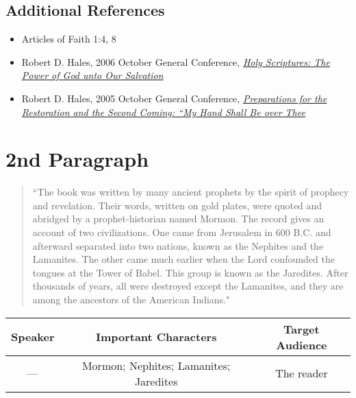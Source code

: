 \documentclass[12pt]{report}
\begin{document}
\subsection{Additional References\label{intro:references1}}
\begin{itemize}
\item Articles of Faith 1:4, 8
\item Robert D. Hales, 2006 October General Conference, \href{https://www.lds.org/general-conference/2006/10/holy-scriptures-the-power-of-god-unto-our-salvation?lang=eng}{\emph{Holy Scriptures: The Power of God unto Our Salvation}}
\item Robert D. Hales, 2005 October General Conference, \href{https://www.lds.org/general-conference/2005/10/preparations-for-the-restoration-and-the-second-coming-my-hand-shall-be-over-thee?lang=eng}{\emph{Preparations for the Restoration and the Second Coming: ``My Hand Shall Be over Thee}}
\end{itemize}

\section{2nd Paragraph\label{intro:2nd}}
\begin{center}
\begin{quote}
``The book was written by many ancient prophets by the spirit of prophecy and revelation.  Their words, written on gold plates, were quoted and abridged by a prophet-historian named Mormon.  The record gives an account of two civilizations.  One came from Jerusalem in 600 \scriptsize B.C. \normalsize and afterward separated into two nations, known as the Nephites and the Lamanites.  The other came much earlier when the Lord confounded the tongues at the Tower of Babel.  This group is known as the Jaredites.  After thousands of years, all were destroyed except the Lamanites, and they are among the ancestors of the American Indians."
\end{quote}
\end{center}

\begin{table}[h!]
\centering
\label{table:intro2}
\begin{tabular*}{\textwidth}{c @{\extracolsep{\fill}}cc}
Speaker & Important Characters & Target Audience \\
\hline
\rule{0pt}{3ex}--- & Mormon; Nephites; Lamanites; Jaredites & The reader 
\end{tabular*}
\end{table}
\end{document}
